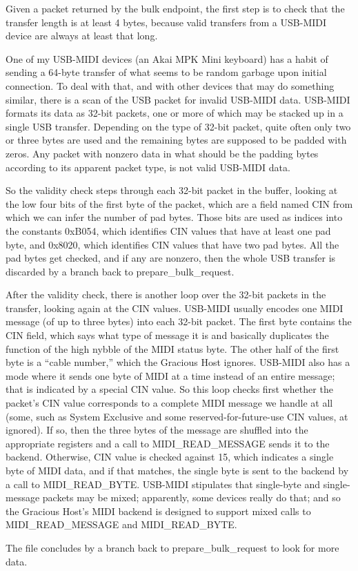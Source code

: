 Given a packet returned by the bulk endpoint, the first step is to check
that the transfer length is at least 4 bytes, because valid transfers from a
USB-MIDI device are always at least that long.

One of my USB-MIDI devices (an Akai MPK Mini keyboard) has a habit of
sending a 64-byte transfer of what seems to be random garbage upon initial
connection.  To deal with that, and with other devices that may do something
similar, there is a scan of the USB packet for invalid USB-MIDI data. 
USB-MIDI formats its data as 32-bit packets, one or more of which may be
stacked up in a single USB transfer.  Depending on the type of 32-bit
packet, quite often only two or three bytes are used and the remaining bytes
are supposed to be padded with zeros.  Any packet with nonzero data in what
should be the padding bytes according to its apparent packet type, is not
valid USB-MIDI data.

So the validity check steps through each 32-bit packet in the buffer,
looking at the low four bits of the first byte of the packet, which are a
field named CIN from which we can infer the number of pad bytes.  Those bits
are used as indices into the constants 0xB054, which identifies CIN values
that have at least one pad byte, and 0x8020, which identifies CIN values
that have two pad bytes.  All the pad bytes get checked, and if any are
nonzero, then the whole USB transfer is discarded by a branch back to
prepare\_bulk\_request.

After the validity check, there is another loop over the 32-bit packets in
the transfer, looking again at the CIN values.  USB-MIDI usually encodes one
MIDI message (of up to three bytes) into each 32-bit packet.  The first byte
contains the CIN field, which says what type of message it is and basically
duplicates the function of the high nybble of the MIDI status byte.  The
other half of the first byte is a ``cable number,'' which the Gracious Host
ignores.  USB-MIDI also has a mode where it sends one byte of MIDI at a time
instead of an entire message; that is indicated by a special CIN value.  So
this loop checks first whether the packet's CIN value corresponds to a
complete MIDI message we handle at all (some, such as System Exclusive and
some reserved-for-future-use CIN values, at ignored).  If so, then the three
bytes of the message are shuffled into the appropriate registers and a call
to MIDI\_READ\_MESSAGE sends it to the backend.  Otherwise, CIN value is
checked against 15, which indicates a single byte of MIDI data, and if that
matches, the single byte is sent to the backend by a call to
MIDI\_READ\_BYTE.  USB-MIDI stipulates that single-byte and single-message
packets may be mixed; apparently, some devices really do that; and so the
Gracious Host's MIDI backend is designed to support mixed calls to 
MIDI\_READ\_MESSAGE and MIDI\_READ\_BYTE.

The file concludes by a branch back to prepare\_bulk\_request to look for more
data.
